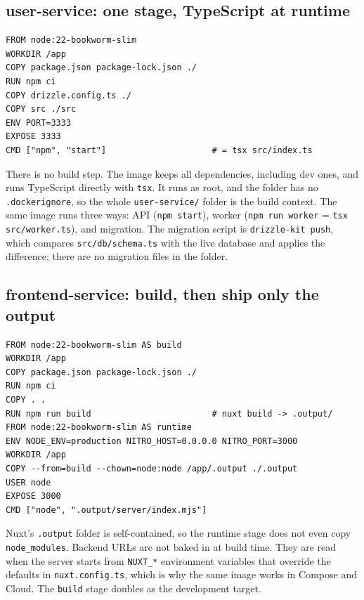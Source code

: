 \documentclass[11pt,a4paper]{article}
\newcommand{\code}[1]{\nolinkurl{#1}}
\begin{document}
\subsection{user-service: one stage, TypeScript at runtime}

\par\noindent\begin{minipage}{\linewidth}
\begin{lstlisting}[language=docker]
FROM node:22-bookworm-slim
WORKDIR /app
COPY package.json package-lock.json ./
RUN npm ci
COPY drizzle.config.ts ./
COPY src ./src
ENV PORT=3333
EXPOSE 3333
CMD ["npm", "start"]                     # = tsx src/index.ts
\end{lstlisting}
\end{minipage}\par

There is no build step. The image keeps all dependencies, including dev ones, and runs
TypeScript directly with \code{tsx}. It runs as root, and the folder has no
\code{.dockerignore}, so the whole \code{user-service/} folder is the build context. The
same image runs three ways: API (\code{npm start}), worker (\code{npm run worker} =
\code{tsx src/worker.ts}), and migration. The migration script is
\code{drizzle-kit push}, which compares \code{src/db/schema.ts} with the live database
and applies the difference; there are no migration files in the folder.

\subsection{frontend-service: build, then ship only the output}

\par\noindent\begin{minipage}{\linewidth}
\begin{lstlisting}[language=docker]
FROM node:22-bookworm-slim AS build
WORKDIR /app
COPY package.json package-lock.json ./
RUN npm ci
COPY . .
RUN npm run build                        # nuxt build -> .output/
FROM node:22-bookworm-slim AS runtime
ENV NODE_ENV=production NITRO_HOST=0.0.0.0 NITRO_PORT=3000
WORKDIR /app
COPY --from=build --chown=node:node /app/.output ./.output
USER node
EXPOSE 3000
CMD ["node", ".output/server/index.mjs"]
\end{lstlisting}
\end{minipage}\par

Nuxt's \code{.output} folder is self-contained, so the runtime stage does not even copy
\code{node_modules}. Backend URLs are not baked in at build time. They are read when
the server starts from \code{NUXT_*} environment variables that override the defaults in
\code{nuxt.config.ts}, which is why the same image works in Compose and Cloud. The
\code{build} stage doubles as the development target.
\end{document}

